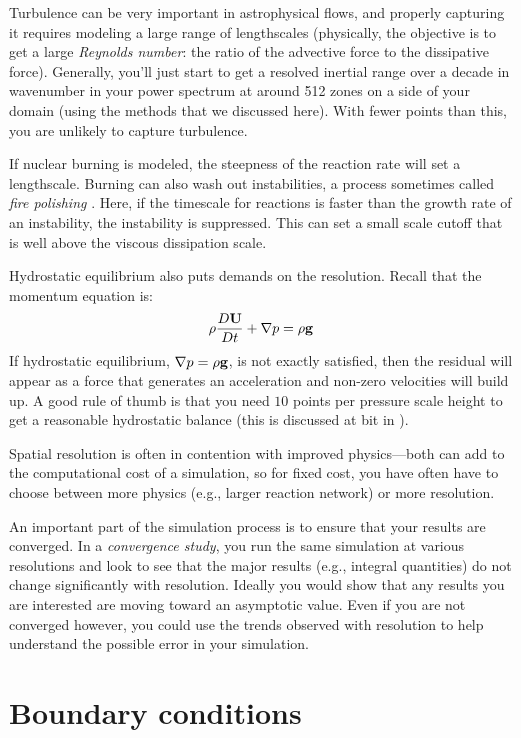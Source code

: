 Turbulence can be very important in astrophysical flows, and properly
capturing it requires modeling a large range of lengthscales
(physically, the objective is to get a large {\em Reynolds number}:
the ratio of the advective force to the dissipative force).
Generally, you'll just start to get a resolved inertial range over a
decade in wavenumber in your power spectrum at around 512 zones on a
side of your domain (using the methods that we discussed here).  With
fewer points than this, you are unlikely to capture turbulence.

If nuclear burning is modeled, the steepness of the reaction rate will
set a lengthscale.  Burning can also wash out instabilities, a process
sometimes called {\em fire polishing} \cite{timmeswoosley,SNrt}.
Here, if the timescale for reactions is faster than the growth rate of
an instability, the instability is suppressed.  This can set a small
scale cutoff that is well above the viscous dissipation scale.

Hydrostatic equilibrium also puts demands on the resolution.  Recall that
the momentum equation is:
\begin{equation}
\rho {\frac{{D{\bf U}}}{D t}} + \nabla p = \rho {\bf g}
\end{equation}
If hydrostatic equilibrium, $\nabla p = \rho {\bf g}$, is not exactly
satisfied, then the residual will appear as a force that generates an
acceleration and non-zero velocities will build up.  A good rule of
thumb is that you need $10$ points per pressure scale height to get a
reasonable hydrostatic balance (this is discussed at bit in
\cite{hse}).

Spatial resolution is often in contention with improved physics---both
can add to the computational cost of a simulation, so for fixed cost,
you have often have to choose between more physics (e.g., larger
reaction network) or more resolution.

An important part of the simulation process is to ensure that your
results are converged.  In a {\em convergence study}, you run the same
simulation at various resolutions and look to see that the major
results (e.g., integral quantities) do not change significantly with
resolution.  Ideally you would show that any results you are
interested are moving toward an asymptotic value.  Even if you are
not converged however, you could use the trends observed with resolution
to help understand the possible error in your simulation.




\section{Boundary conditions}

